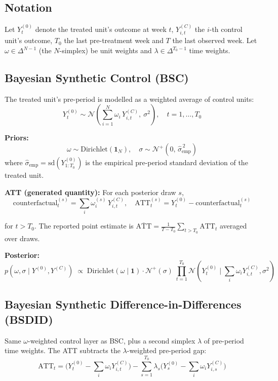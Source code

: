 \documentclass[a4paper,11pt]{article}
\begin{document}
\subsection{Notation}

Let $Y^{(0)}_t$ denote the treated unit's outcome at week $t$,
$Y^{(C)}_{i, t}$ the $i$-th control unit's outcome, $T_0$ the last
pre-treatment week and $T$ the last observed week. Let
$\omega \in \Delta^{N-1}$ (the $N$-simplex) be unit weights and
$\lambda \in \Delta^{T_0 - 1}$ time weights.

\subsection{Bayesian Synthetic Control (BSC)}

The treated unit's pre-period is modelled as a weighted average of
control units:
$$Y^{(0)}_t \sim \mathcal{N}\!\left(\sum_{i=1}^{N} \omega_i \, Y^{(C)}_{i,t},\ \sigma^2\right), \quad t = 1, \ldots, T_0$$

\textbf{Priors:}
$$\omega \sim \mathrm{Dirichlet}(\mathbf{1}_N), \quad \sigma \sim \mathcal{N}^{+}(0,\, \widehat{\sigma}_{\text{emp}}^{\,2})$$
where $\widehat{\sigma}_{\text{emp}} = \mathrm{sd}(Y^{(0)}_{1:T_0})$ is the empirical pre-period standard deviation of the treated unit.

\textbf{ATT (generated quantity):} For each posterior draw $s$,
$$\text{counterfactual}_t^{(s)} = \sum_i \omega_i^{(s)} \, Y^{(C)}_{i, t}, \quad \mathrm{ATT}_t^{(s)} = Y^{(0)}_t - \text{counterfactual}_t^{(s)}$$

for $t > T_0$. The reported point estimate is
$\overline{\mathrm{ATT}} = \tfrac{1}{T-T_0} \sum_{t > T_0} \mathrm{ATT}_t$ averaged over draws.

\textbf{Posterior:}
$$p(\omega, \sigma \mid Y^{(0)}, Y^{(C)}) \; \propto \; \mathrm{Dirichlet}(\omega \mid \mathbf{1}) \cdot \mathcal{N}^{+}(\sigma) \; \prod_{t=1}^{T_0} \mathcal{N}\!\left(Y^{(0)}_t \; \Big| \; \sum_i \omega_i Y^{(C)}_{i,t}, \sigma^2\right)$$

\subsection{Bayesian Synthetic Difference-in-Differences (BSDID)}

Same $\omega$-weighted control layer as BSC, plus a second simplex
$\lambda$ of pre-period time weights. The ATT subtracts the
$\lambda$-weighted pre-period gap:
$$\mathrm{ATT}_t = \Big(Y^{(0)}_t - \sum_i \omega_i Y^{(C)}_{i,t}\Big) - \sum_{s=1}^{T_0} \lambda_s \Big(Y^{(0)}_s - \sum_i \omega_i Y^{(C)}_{i,s}\Big)$$
\end{document}
